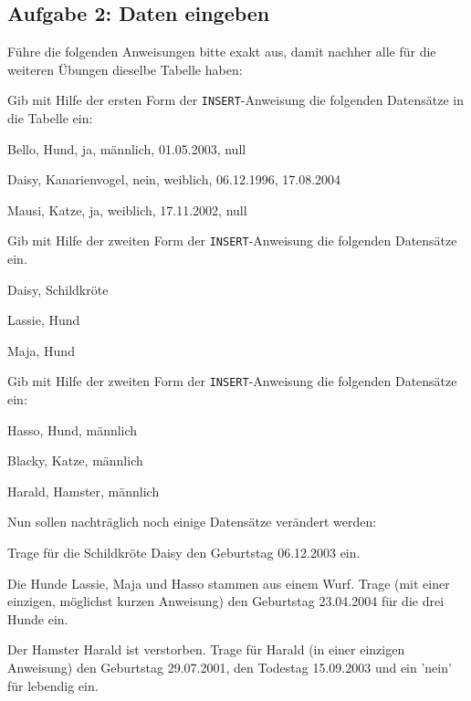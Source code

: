 \subsection{Aufgabe 2: Daten eingeben}

Führe die folgenden Anweisungen bitte exakt aus, damit nachher alle für die
weiteren Übungen dieselbe Tabelle haben:

\begin{compactenum}[a)]
\item Gib mit Hilfe der ersten Form der \lstinline{INSERT}-Anweisung die
folgenden Datensätze in die Tabelle  ein:

\begin{compactitem}
  \item Bello, Hund, ja, männlich, 01.05.2003, null
  \item Daisy, Kanarienvogel, nein, weiblich, 06.12.1996, 17.08.2004
  \item Mausi, Katze, ja, weiblich, 17.11.2002, null
\end{compactitem}

\item Gib mit Hilfe der zweiten Form der \lstinline{INSERT}-Anweisung die
folgenden Datensätze ein.

\begin{compactitem}
  \item Daisy, Schildkröte
  \item Lassie, Hund
  \item Maja, Hund
\end{compactitem}

\item Gib mit Hilfe der zweiten Form der \lstinline{INSERT}-Anweisung die
folgenden Datensätze ein:

\begin{compactitem}
  \item Hasso, Hund, männlich
  \item Blacky, Katze, männlich
  \item Harald, Hamster, männlich
\end{compactitem}

\item Nun sollen nachträglich noch einige Datensätze verändert werden:

\begin{compactitem}
  \item Trage für die Schildkröte Daisy den Geburtstag 06.12.2003 ein.
  \item Die Hunde Lassie, Maja und Hasso stammen aus einem Wurf. Trage (mit einer 
  einzigen, möglichst kurzen Anweisung) den Geburtstag 23.04.2004 für die drei
  Hunde ein.
  \item Der Hamster Harald ist verstorben. Trage für Harald (in einer einzigen
  Anweisung) den Geburtstag 29.07.2001, den Todestag 15.09.2003 und ein ’nein’
  für lebendig ein.
\end{compactitem}
\end{compactenum}


